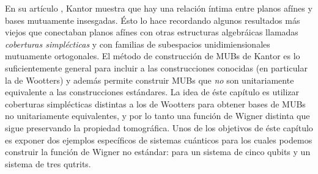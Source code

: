 \documentclass[a4paper]{report}
\begin{document}
  En su artículo \cite{kantor2012}, Kantor muestra que hay
  una relación íntima entre planos afínes y bases mutuamente
  insesgadas.  Ésto lo hace recordando algunos resultados
  más viejos que conectaban planos afínes con otras
  estructuras algebráicas llamadas \textit{coberturas
  simplécticas} y con familias de subespacios
  unidimiensionales mutuamente ortogonales.  El método de
  construcción de MUBs de Kantor es lo suficientemente
  general para incluir a las construcciones conocidas (en
  particular la de Wootters) y además permite construir MUBs
  que \textit{no} son unitariamente equivalente a las
  construcciones estándares. La idea de éste capítulo es
  utilizar coberturas simplécticas distintas a los de
  Wootters para obtener bases de MUBs no unitariamente
  equivalentes, y por lo tanto una función de Wigner
  distinta que sigue preservando la propiedad tomográfica.
  Unos de los objetivos de éste capítulo es exponer dos
  ejemplos específicos de sistemas cuánticos para los cuales
  podemos construir la función de Wigner no estándar: para
  un sistema de cinco qubits y un sistema de tres qutrits.
\end{document}
